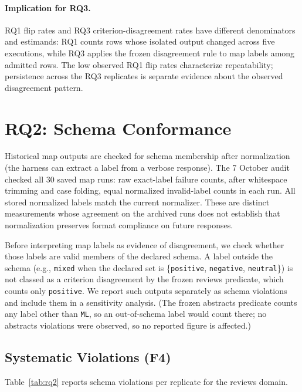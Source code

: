\documentclass[11pt]{article}
\begin{document}
\paragraph{Implication for RQ3.}
RQ1 flip rates and RQ3 criterion-disagreement rates have different
denominators and estimands: RQ1 counts rows whose isolated output changed
across five executions, while RQ3 applies the frozen disagreement rule to map labels
among admitted rows. The low observed RQ1 flip
rates characterize repeatability; persistence across the RQ3 replicates is
separate evidence about the observed disagreement pattern.


\section{RQ2: Schema Conformance}
\label{sec:rq2}

Historical map outputs are checked for schema membership after normalization
(the harness can extract a label from a verbose response). The 7 October audit
checked all 30 saved map runs: raw exact-label failure counts, after whitespace
trimming and case folding, equal normalized invalid-label counts in each run.
All stored normalized labels match the current normalizer. These are distinct
measurements whose agreement on the archived runs does not establish that
normalization preserves format compliance on future responses.

Before interpreting map labels as evidence of disagreement, we check
whether those labels are valid members of the declared schema. A label
outside the schema (e.g., \texttt{mixed} when the declared set is
\{\texttt{positive}, \texttt{negative}, \texttt{neutral}\}) is not classed as
a criterion disagreement by the frozen reviews predicate, which counts only
\texttt{positive}. We report such outputs separately as schema violations and
include them in a sensitivity analysis. (The frozen abstracts predicate counts
any label other than \texttt{ML}, so an out-of-schema label would count there;
no abstracts violations were observed, so no reported figure is affected.)

\subsection{Systematic Violations (F4)}

Table~\ref{tab:rq2} reports schema violations per replicate for the
reviews domain.
\end{document}

